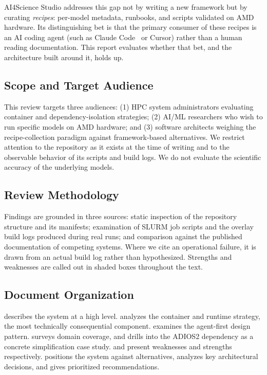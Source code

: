 \documentclass[11pt]{article}
\begin{document}
AI4Science Studio addresses this gap not by writing a new framework but by
curating \emph{recipes}: per-model metadata, runbooks, and scripts validated on
AMD hardware. Its distinguishing bet is that the primary consumer of these
recipes is an AI coding agent (such as Claude Code~\cite{anthropic2024claudecode}
or Cursor) rather than a human reading documentation. This report evaluates
whether that bet, and the architecture built around it, holds up.

\subsection{Scope and Target Audience}
This review targets three audiences: (1) HPC system administrators evaluating
container and dependency-isolation strategies; (2) AI/ML researchers who wish to
run specific models on AMD hardware; and (3) software architects weighing the
recipe-collection paradigm against framework-based alternatives. We restrict
attention to the repository as it exists at the time of writing and to the
observable behavior of its scripts and build logs. We do not evaluate the
scientific accuracy of the underlying models.

\subsection{Review Methodology}
Findings are grounded in three sources: static inspection of the repository
structure and its manifests; examination of SLURM job scripts and the overlay
build logs produced during real runs; and comparison against the published
documentation of competing systems. Where we cite an operational failure, it is
drawn from an actual build log rather than hypothesized. Strengths and weaknesses
are called out in shaded boxes throughout the text.

\subsection{Document Organization}
 describes the system at a high level. 
analyzes the container and runtime strategy, the most technically consequential
component.  examines the agent-first design pattern.
 surveys domain coverage, and  drills into the
ADIOS2 dependency as a concrete simplification case study. 
and  present weaknesses and strengths respectively.
 positions the system against alternatives, 
analyzes key architectural decisions, and  gives
prioritized recommendations.
\end{document}
